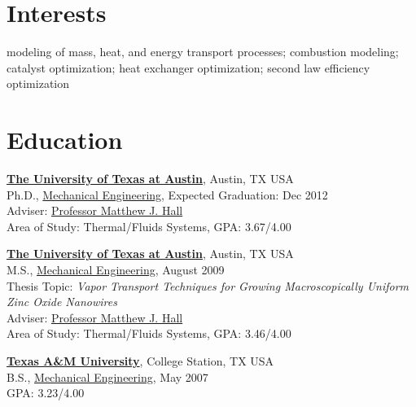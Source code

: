 \documentclass[line,margin]{res}
\begin{document}
\address{\href{mailto:calbaker@utexas.edu}{calbaker@mail.utexas.edu}} 
\address{214-695-4636}
 
\begin{resume}
 
\section{Interests}
%
modeling of mass, heat, and energy transport processes; combustion
modeling; catalyst optimization; heat exchanger optimization; second
law efficiency optimization
 
\section{Education}
%
\href{http://www.utexas.edu/}{\textbf{The University of Texas at
    Austin}}, Austin, TX USA \\
Ph.D., \href{http://www.me.utexas.edu/}{Mechanical Engineering},
Expected Graduation: Dec 2012 \\ 
Adviser:
\href{http://www.me.utexas.edu/directory/faculty/hall/matthew/33/}{Professor
  Matthew J. Hall} \\
Area of Study: Thermal/Fluids Systems, GPA: 3.67/4.00

\href{http://www.utexas.edu/}{\textbf{The University of Texas at
    Austin}}, Austin, TX USA \\ 
M.S., \href{http://www.me.utexas.edu/}{Mechanical Engineering}, August
2009 \\
Thesis Topic: \emph{Vapor Transport Techniques for Growing
  Macroscopically Uniform Zinc Oxide Nanowires} \\
Adviser:
\href{http://www.me.utexas.edu/directory/faculty/hall/matthew/33/}{Professor
  Matthew J. Hall} \\
Area of Study: Thermal/Fluids Systems, GPA: 3.46/4.00

\href{http://www.tamu.edu/}{\textbf{Texas A\&M University}}, College
Station, TX USA \\
B.S., \href{http://www.mengr.tamu.edu/}{Mechanical Engineering}, May
2007  \\
GPA: 3.23/4.00


\end{resume}
\end{document}
